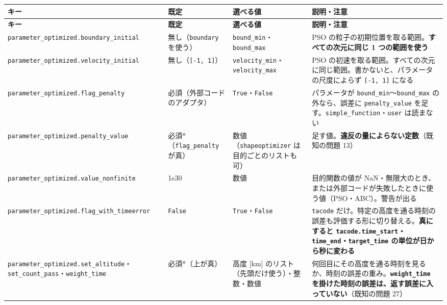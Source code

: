 \begingroup\small
\begin{longtable}{>{\raggedright\arraybackslash}p{}>{\raggedright\arraybackslash}p{}>{\raggedright\arraybackslash}p{}>{\raggedright\arraybackslash}p{}}
\toprule
\textbf{キー} & \textbf{既定} & \textbf{選べる値} & \textbf{説明・注意} \\
\midrule
\endfirsthead
\toprule
\textbf{キー} & \textbf{既定} & \textbf{選べる値} & \textbf{説明・注意} \\
\midrule
\endhead
\bottomrule
\endlastfoot
\texttt{parameter\_\allowbreak{}optimized.\allowbreak{}boundary\_\allowbreak{}initial} & 無し（\texttt{boundary} を使う） & \texttt{bound\_\allowbreak{}min}・\texttt{bound\_\allowbreak{}max} & PSO の粒子の初期位置を取る範囲。\textbf{すべての次元に同じ 1 つの範囲を使う} \\
\texttt{parameter\_\allowbreak{}optimized.\allowbreak{}velocity\_\allowbreak{}initial} & 無し（\texttt{[-1,\allowbreak{} 1]\allowbreak{}}） & \texttt{velocity\_\allowbreak{}min}・\texttt{velocity\_\allowbreak{}max} & PSO の初速を取る範囲。すべての次元に同じ範囲。書かないと、パラメータの尺度によらず \texttt{[-1,\allowbreak{} 1]\allowbreak{}} になる \\
\texttt{parameter\_\allowbreak{}optimized.\allowbreak{}flag\_\allowbreak{}penalty} & 必須（外部コードのアダプタ） & \texttt{True}・\texttt{False} & パラメータが \texttt{bound\_\allowbreak{}min}〜\texttt{bound\_\allowbreak{}max} の外なら、誤差に \texttt{penalty\_\allowbreak{}value} を足す。\texttt{simple\_\allowbreak{}function}・\texttt{user} は読まない \\
\texttt{parameter\_\allowbreak{}optimized.\allowbreak{}penalty\_\allowbreak{}value} & 必須*（\texttt{flag\_\allowbreak{}penalty} が真） & 数値（\texttt{shapeoptimizer} は目的ごとのリストも可） & 足す値。\textbf{違反の量によらない定数}（既知の問題 13） \\
\texttt{parameter\_\allowbreak{}optimized.\allowbreak{}value\_\allowbreak{}nonfinite} & 1e30 & 数値 & 目的関数の値が NaN・無限大のとき、または外部コードが失敗したときに使う値（PSO・ABC）。警告が出る \\
\texttt{parameter\_\allowbreak{}optimized.\allowbreak{}flag\_\allowbreak{}with\_\allowbreak{}timeerror} & \texttt{False} & \texttt{True}・\texttt{False} & \texttt{tacode} だけ。特定の高度を通る時刻の誤差も評価する形に切り替える。\textbf{真にすると \texttt{tacode.\allowbreak{}time\_\allowbreak{}start}・\texttt{time\_\allowbreak{}end}・\texttt{target\_\allowbreak{}time} の単位が日から秒に変わる} \\
\texttt{parameter\_\allowbreak{}optimized.\allowbreak{}set\_\allowbreak{}altitude}・\texttt{set\_\allowbreak{}count\_\allowbreak{}pass}・\texttt{weight\_\allowbreak{}time} & 必須*（上が真） & 高度 [km] のリスト（先頭だけ使う）・整数・数値 & 何回目にその高度を通る時刻を見るか、時刻の誤差の重み。\textbf{\texttt{weight\_\allowbreak{}time} を掛けた時刻の誤差は、返す誤差に入っていない}（既知の問題 27） \\
\end{longtable}
\endgroup

